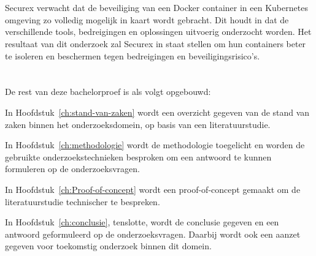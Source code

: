 \section{}%
\label{sec:onderzoeksdoelstelling}

Securex verwacht dat de beveiliging van een Docker container in een Kubernetes omgeving zo volledig mogelijk in kaart wordt gebracht. Dit houdt in dat de verschillende tools, bedreigingen en oplossingen uitvoerig onderzocht worden. Het resultaat van dit onderzoek zal Securex in staat stellen om hun containers beter te isoleren en beschermen tegen bedreigingen en beveiligingsrisico's.

\section{}%
\label{sec:opzet-bachelorproef}


De rest van deze bachelorproef is als volgt opgebouwd:

In Hoofdstuk~\ref{ch:stand-van-zaken} wordt een overzicht gegeven van de stand van zaken binnen het onderzoeksdomein, op basis van een literatuurstudie.

In Hoofdstuk~\ref{ch:methodologie} wordt de methodologie toegelicht en worden de gebruikte onderzoekstechnieken besproken om een antwoord te kunnen formuleren op de onderzoeksvragen.

In Hoofdstuk~\ref{ch:Proof-of-concept} wordt een proof-of-concept gemaakt om de literatuurstudie technischer te bespreken.

In Hoofdstuk~\ref{ch:conclusie}, tenslotte, wordt de conclusie gegeven en een antwoord geformuleerd op de onderzoeksvragen. Daarbij wordt ook een aanzet gegeven voor toekomstig onderzoek binnen dit domein.